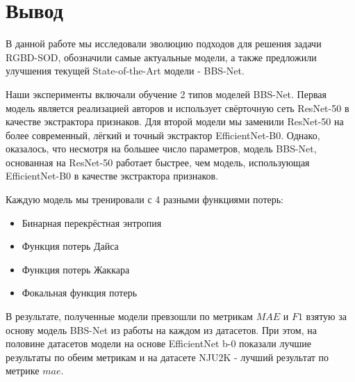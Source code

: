 \section{Вывод}


В данной работе мы исследовали эволюцию подходов для решения задачи RGBD-SOD, обозначили самые актуальные модели, 
а также предложили улучшения текущей State-of-the-Art модели - BBS-Net\cite{BBS}.

Наши эксперименты включали обучение 2 типов моделей BBS-Net. Первая модель является реализацией авторов \cite{BBS} и 
использует свёрточную сеть ResNet-50\cite{ResNet} в качестве экстрактора признаков. Для второй модели мы заменили ResNet-50 на более
современный, лёгкий и точный экстрактор EfficientNet-B0\cite{Efficientnet}. Однако, оказалось, что несмотря на большее число параметров, модель BBS-Net, 
основанная на ResNet-50 работает быстрее, чем модель, использующая EfficientNet-B0 в качестве экстрактора признаков. 

Каждую модель мы тренировали с 4 разными функциями потерь: 
\begin{itemize}
    \item Бинарная перекрёстная энтропия \cite{CE}
    \item Функция потерь Дайса\cite{Dice-Loss}
    \item Функция потерь Жаккара\cite{IoU-Loss}
    \item Фокальная функция потерь \cite{Focal-Loss}
\end{itemize}

В результате, полученные модели превзошли по метрикам $MAE$ и $F1$ взятую за основу модель BBS-Net из работы \cite{BBS} 
на каждом из датасетов. При этом, на половине датасетов модели на основе EfficientNet b-0 показали 
лучшие результаты по обеим метрикам и на датасете NJU2K - лучший результат по метрике $mae$.